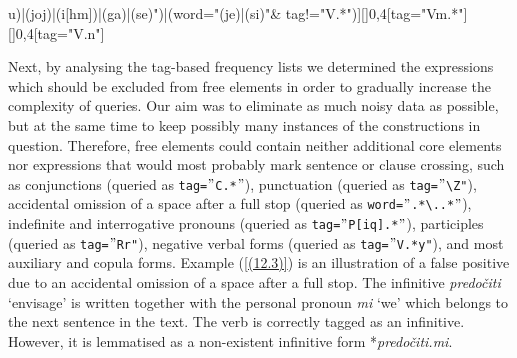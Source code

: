 \noindent\begin{verbatim*}
[(word="([mj]u)|(joj)|(i[hm])|(ga)|(se)")|(word="(je)|(si)"&
tag!="V.*")][]{0,4}[tag="Vm.*"][]{0,4}[tag="V.n"]
\end{verbatim*}


\noindent Next, by analysing the tag-based frequency lists we determined the expressions which should be excluded from free elements in order to gradually increase the complexity of queries. Our aim was to eliminate as much noisy data as possible, but at the same time to keep possibly many instances of the constructions in question. Therefore, free elements could contain neither additional core elements nor expressions that would most probably mark sentence or clause crossing, such as conjunctions (queried as \texttt{tag=$"$C.*$"$}), punctuation (queried as \texttt{tag=$"$\textbackslash{}Z"}), accidental omission of a space after a full stop (queried as \texttt{word=$"$.*\textbackslash{}..*$"$}), indefinite and interrogative pronouns (queried as \texttt{tag=$"$P[iq].*$"$}), participles (queried as \texttt{tag=$"$Rr"}), negative verbal forms (queried as \texttt{tag=$"$V.*y"}), and most auxiliary and copula forms. Example (\ref{(12.3)}) is an illustration of a false positive due to an accidental omission of a space after a full stop. The infinitive \textit{predočiti} ‘envisage’ is written together with the personal pronoun \textit{mi} ‘we’ which belongs to the next sentence in the text. The verb is correctly tagged as an infinitive. However, it is lemmatised as a non-existent infinitive form *\textit{predočiti.mi}.


